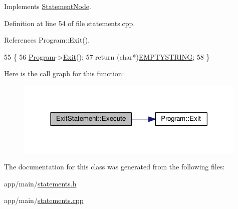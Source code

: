 Implements \hyperlink{classStatementNode_a721589622c930c010927b9a9c55b173e}{Statement\+Node}.



Definition at line 54 of file statements.\+cpp.



References Program\+::\+Exit().


\begin{DoxyCode}
55 \{
56     \hyperlink{classProgram}{Program}->\hyperlink{classProgram_adf53af02e6c4719ec0f019f0d305f80e}{Exit}();
57     \textcolor{keywordflow}{return} (\textcolor{keywordtype}{char}*)\hyperlink{platform_8h_a79ff1b9ff232b38c8b5600659e6bc7c2}{EMPTYSTRING};
58 \}
\end{DoxyCode}


Here is the call graph for this function\+:\nopagebreak
\begin{figure}[H]
\begin{center}
\leavevmode
\includegraphics[width=314pt]{classExitStatement_a0c7aef922938d7f7f02b8ca402a3bd38_cgraph}
\end{center}
\end{figure}




The documentation for this class was generated from the following files\+:\begin{DoxyCompactItemize}
\item 
app/main/\hyperlink{statements_8h}{statements.\+h}\item 
app/main/\hyperlink{statements_8cpp}{statements.\+cpp}\end{DoxyCompactItemize}
